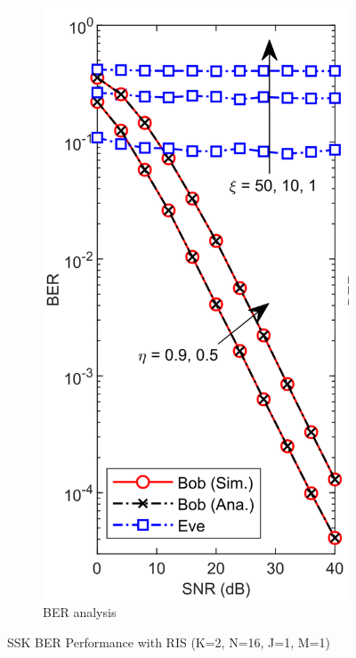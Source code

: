 \begin{figure}[H]
\begin{subfigure}[b]{0.23\textwidth}
    \includegraphics[width=\textwidth]{imgs/og_ber_simulation.png}
    \caption{\cite{9328149} BER analysis}
    \label{fig:og_ber_sim}
  \end{subfigure}
  \caption{SSK BER Performance with RIS (K=2, N=16, J=1, M=1)}
\end{figure}

